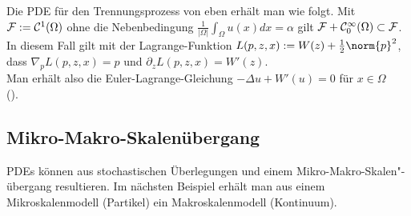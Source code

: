 \linie

\begin{Bsp}
    Die PDE für den Trennungsprozess von eben erhält man wie folgt.
    Mit $\mathcal{F} := \mathcal{C}^1(\Omega)$ ohne die Nebenbedingung
    $\frac{1}{|\Omega|} \int_\Omega u(x)dx = \alpha$
    gilt $\mathcal{F} + \mathcal{C}_0^\infty(\Omega) \subset \mathcal{F}$.
    In diesem Fall gilt mit der Lagrange-Funktion $L(p, z, x) := W(z) + \frac{1}{2} \norm{p}^2$,
    dass $\nabla_p L(p, z, x) = p$ und $\partial_z L(p, z, x) = W'(z)$.\\
    Man erhält also die Euler-Lagrange-Gleichung
    $-\Delta u + W'(u) = 0$ für $x \in \Omega$\\
    ().
\end{Bsp}

\subsection{%
    Mikro-Makro-Skalenübergang%
}

\begin{Bem}
    PDEs können aus stochastischen Überlegungen und einem Mikro-Makro-Skalen"-übergang resultieren.
    Im nächsten Beispiel erhält man aus einem Mikroskalenmodell (Partikel) ein
    Makroskalenmodell (Kontinuum).
\end{Bem}

\linie

